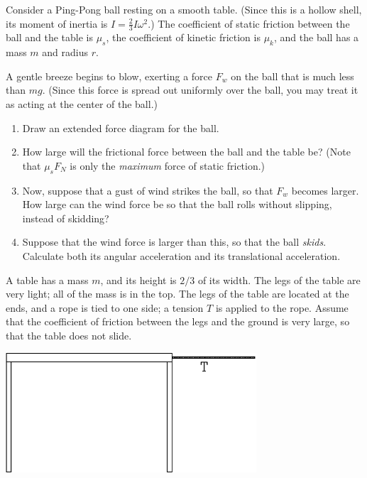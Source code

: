 \documentclass[12pt]{article}
\begin{document}
Consider a Ping-Pong ball resting on a smooth table. (Since this is a hollow shell, its moment of inertia is 
$I=\frac{2}{3}I\omega^2$.) The coefficient of static friction between the ball and the table is $\mu_s$, 
the coefficient of kinetic friction is $\mu_k$, and the 
ball has a mass $m$ and radius $r$.

A gentle breeze begins to blow, exerting a force $F_w$ on the ball that is much less than $mg$. (Since this force is spread out uniformly over the ball,
you may treat it as acting at the center of the ball.)

\begin{enumerate}

\item Draw an extended force diagram for the ball.

\vspace{4in}

\newpage

\item How large will the frictional force between the ball and the table be? (Note that $\mu_s F_N$ is only the 
{\it maximum} force of static friction.)

\vspace{3in}

\item Now, suppose that a gust of wind strikes the ball, so that $F_w$ becomes larger. How large can the wind force
be so that the ball rolls without slipping, instead of skidding?

\vspace{2in}

\item Suppose that the wind force is larger than this, so that the ball {\it skids}. Calculate both its angular
acceleration and its translational acceleration.
\end{enumerate}

\newpage

\begin{minipage}{0.5\textwidth}
A table has a mass $m$, and its height is $2/3$ of its width. The legs of the table are very light; all of the mass is in the top.
The legs of the table are located at the ends, and a rope is tied to one side; a tension $T$ is applied to the rope. Assume that the coefficient of friction between
the legs and the ground is very large, so that the table does not slide.
\end{minipage}
\begin{minipage}{0.5\textwidth}
\begin{center}
\includegraphics[width=0.7\textwidth]{table-crop.pdf}
\end{center}
\end{minipage}
\end{document}
